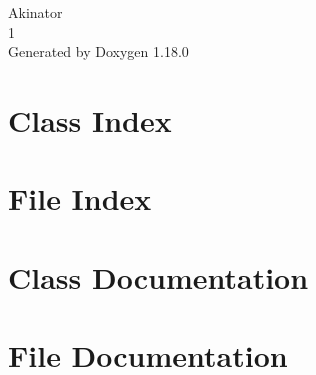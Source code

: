 \documentclass[twoside]{book}
\newcommand{\+}{\discretionary{\mbox{\scriptsize$\hookleftarrow$}}{}{}}
\newcommand{\clearemptydoublepage}{%
    \newpage{\pagestyle{empty}\cleardoublepage}%
  }
\begin{document}
  \raggedbottom
    \hypersetup{pageanchor=false,
                bookmarksnumbered=true,
                pdfencoding=unicode
               }
  \begin{titlepage}
  \vspace*{7cm}
  \begin{center}%
  {\Large Akinator}\\
  [1ex]\large 1 \\
  \vspace*{1cm}
  {\large Generated by Doxygen 1.18.0}\\
  \end{center}
  \end{titlepage}
  \clearemptydoublepage
  \tableofcontents
  \clearemptydoublepage
  \hypersetup{pageanchor=true}

\chapter{Class Index}

\chapter{File Index}

\chapter{Class Documentation}





\chapter{File Documentation}











  \backmatter
  \newpage
  \clearemptydoublepage
  \printindex
\end{document}
